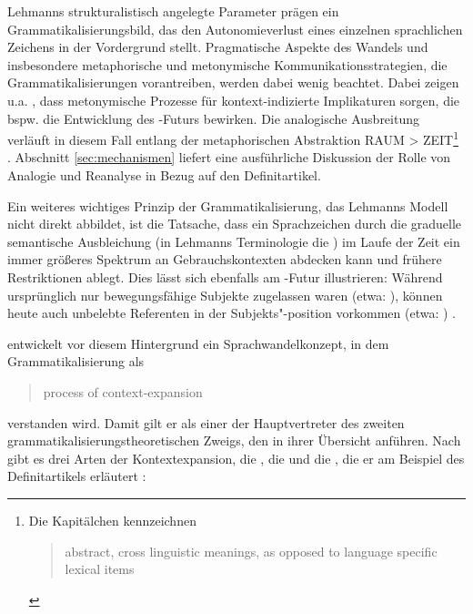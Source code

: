 Lehmanns strukturalistisch angelegte Parameter prägen ein Grammatikalisierungsbild, das den Autonomieverlust eines einzelnen sprachlichen Zeichens in der Vordergrund stellt. Pragmatische Aspekte des Wandels und insbesondere metaphorische und metonymische Kommunikationsstrategien, die Grammatikalisierungen vorantreiben, werden dabei wenig beachtet. Dabei zeigen u.a. \textcite[84-93]{Hopper2006}, dass metonymische Prozesse für kontext-indizierte Implikaturen sorgen, die bspw. die Entwicklung des -Futurs bewirken. Die analogische Ausbreitung verläuft in diesem Fall entlang der metaphorischen Abstraktion \textsc{RAUM > ZEIT}\footnote{Die Kapitälchen kennzeichnen \blockcquote[85]{Hopper2006}{abstract, cross linguistic meanings, as opposed to language specific lexical items}.} \parencite[s. auch][45f.]{Heine1991}. Abschnitt \ref{sec:mechanismen} liefert eine ausführliche Diskussion der Rolle von Analogie und Reanalyse in Bezug auf den Definitartikel. 

Ein weiteres wichtiges Prinzip der Grammatikalisierung, das Lehmanns Modell nicht direkt abbildet, ist die Tatsache, dass ein Sprachzeichen durch die graduelle semantische Ausbleichung  (in Lehmanns Terminologie die ) im Laufe der Zeit ein immer größeres Spektrum an Gebrauchskontexten abdecken kann und frühere Restriktionen ablegt. Dies lässt sich ebenfalls am -Futur illustrieren: Während ursprünglich  nur bewegungsfähige Subjekte zugelassen waren (etwa: ), können heute auch unbelebte Referenten in der Subjekts"-position vorkommen (etwa: )  \parencite[Beispiele nach][5-6]{Bybee1994}. 

\textcite{Himmelmann1997,Himmelmann2004} entwickelt vor diesem Hintergrund ein Sprachwandelkonzept, in dem Grammatikalisierung als \blockcquote[32]{Himmelmann2004}{process of context-expansion} verstanden wird. Damit gilt er als einer der Hauptvertreter des zweiten grammatikalisierungstheoretischen Zweigs, den \textcite[105ff.]{Traugott2013} in ihrer Übersicht anführen. Nach \textcite{Himmelmann2004} gibt es drei Arten der Kontextexpansion, die , die  und die , die er am Beispiel des Definitartikels erläutert \parencite[s.][32-33]{Himmelmann2004}: 

